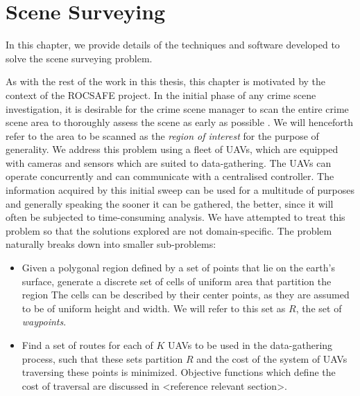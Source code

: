 \chapter{Scene Surveying}\label{chapter:SceneSurveying}
In this chapter, we provide details of the techniques and software developed to solve the scene surveying problem.

As with the rest of the work in this thesis, this chapter is motivated by the context of the ROCSAFE project. In the initial phase of any crime scene investigation, it is desirable for the crime scene manager to scan the entire crime scene area to thoroughly assess the scene as early as possible \cite{TechnicalWorkingGrouponCrimeSceneInvestigation2013CrimeEnforcement}. We will henceforth refer to the area to be scanned as the \textit{region of interest} for the purpose of generality. We address this problem using a fleet of UAVs, which are equipped with cameras and sensors which are suited to data-gathering. The UAVs can operate concurrently and can communicate with a centralised controller. The information acquired by this initial sweep can be used for a multitude of purposes and generally speaking the sooner it can be gathered, the better, since it will often be subjected to time-consuming analysis. We have attempted to treat this problem so that the solutions explored are not domain-specific. The problem naturally breaks down into smaller sub-problems:
\begin{itemize}
    \item Given a polygonal region defined by a set of points that lie on the earth's surface, generate a discrete set of cells of uniform area that partition the region 
    The cells can be described by their center points, as they are assumed to be of uniform height and width. We will refer to this set as $R$, the set of \textit{waypoints}.
    \item Find a set of routes for each of $K$ UAVs to be used in the data-gathering process, such that these sets partition $R$ and the cost of the system of UAVs traversing these points is minimized. Objective functions which define the cost of traversal are discussed in <reference relevant section>.
\end{itemize}

